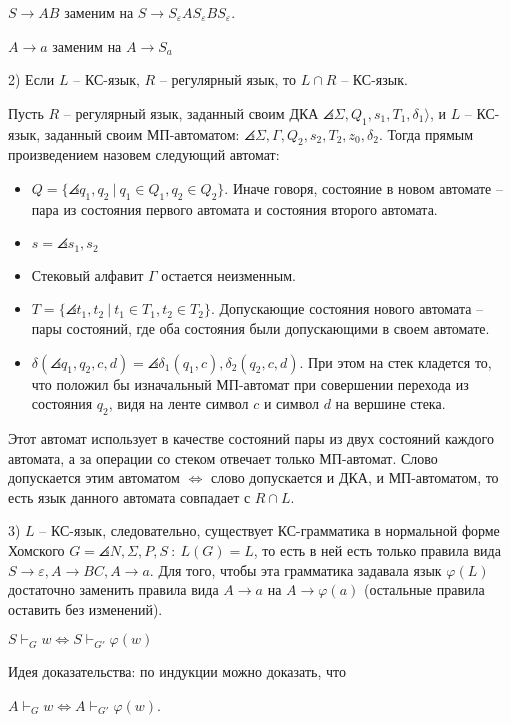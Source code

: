 $S \to AB$ заменим на $S \to S_{\varepsilon} A S_{\varepsilon} B S_{\varepsilon}$.

$A \to a$ заменим на $A \to S_a$

2) Если $L$ -- КС-язык, $R$ -- регулярный язык, то $L \cap R$ -- КС-язык.

Пусть $R$ -- регулярный язык, заданный своим ДКА $\angles{\Sigma, Q_1, s_1, T_1, \delta_1⟩}$, и $L$ -- КС-язык, заданный своим МП-автоматом: $\angles{\Sigma, \Gamma, Q_2, s_2, T_2, z_0, \delta_2}$. Тогда прямым произведением назовем следующий автомат:

\begin{itemize}
    \item $Q = \{ \angles{q_1, q_2}\ |\ q_1 \in Q_1, q_2 \in Q_2 \}$. Иначе говоря, состояние в новом автомате -- пара из состояния первого автомата и состояния второго автомата.
    
    \item $s = \angles{s_1, s_2}$
    
    \item Стековый алфавит $\Gamma$ остается неизменным.
    
    \item $T = \{ \angles{t_1,t_2}\ |\ t_1 \in T_1, t_2 \in T_2 \}$. Допускающие состояния нового автомата -- пары состояний, где оба состояния были допускающими в своем автомате.
    
    \item $\delta(\angles{q_1, q_2}, c, d) = \angles{\delta_{1}(q_1, c), \delta_{2}(q_2, c, d)}$. 
    При этом на стек кладется то, что положил бы изначальный МП-автомат при совершении перехода из состояния $q_2$, видя на ленте символ $c$ и символ $d$ на вершине стека.
    
\end{itemize}


Этот автомат использует в качестве состояний пары из двух состояний каждого автомата, а за операции со стеком отвечает только МП-автомат. Слово допускается этим автоматом $\Leftrightarrow$ слово допускается и ДКА, и МП-автоматом, то есть язык данного автомата совпадает с $R \cap L$.

3) $L$ -- КС-язык, следовательно, существует КС-грамматика в нормальной форме Хомского $G = \angles{N, \Sigma, P, S}\ :\ L(G) = L$, то есть в ней есть только правила вида $S \to \varepsilon, A \to BC, A \to a$. Для того, чтобы эта грамматика задавала язык $\varphi(L)$ достаточно заменить правила вида $A \to a$ на $A \to \varphi(a)$ (остальные правила оставить без изменений).

$S \vdash_G w \Leftrightarrow S \vdash_{G'} \varphi(w)$

Идея доказательства: по индукции можно доказать, что

$A \vdash_G w \Leftrightarrow A \vdash_{G'} \varphi(w)$.
